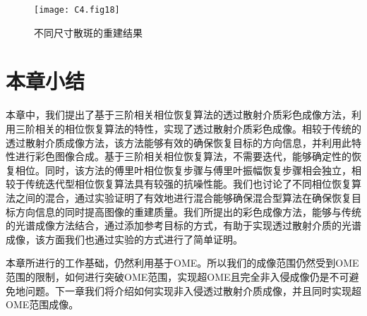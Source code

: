 \begin{figure}[htp]
	\centering
	\texttt{[image: C4.fig18]}
	\caption{不同尺寸散斑的重建结果}
	\label{fig:4.18}
\end{figure}
\section{本章小结}

本章中，我们提出了基于三阶相关相位恢复算法的透过散射介质彩色成像方法，利用三阶相关的相位恢复算法的特性，实现了透过散射介质彩色成像。相较于传统的透过散射介质成像方法，该方法能够有效的确保恢复目标的方向信息，并利用此特性进行彩色图像合成。基于三阶相关相位恢复算法，不需要迭代，能够确定性的恢复相位。同时，该方法的傅里叶相位恢复步骤与傅里叶振幅恢复步骤相会独立，相较于传统迭代型相位恢复算法具有较强的抗噪性能。我们也讨论了不同相位恢复算法之间的混合，通过实验证明了有效地进行混合能够确保混合型算法在确保恢复目标方向信息的同时提高图像的重建质量。我们所提出的彩色成像方法，能够与传统的光谱成像方法结合，通过添加参考目标的方式，有助于实现透过散射介质的光谱成像，该方面我们也通过实验的方式进行了简单证明。

本章所进行的工作基础，仍然利用基于OME。所以我们的成像范围仍然受到OME范围的限制，如何进行突破OME范围，实现超OME且完全非入侵成像仍是不可避免地问题。下一章我们将介绍如何实现非入侵透过散射介质成像，并且同时实现超OME范围成像。

